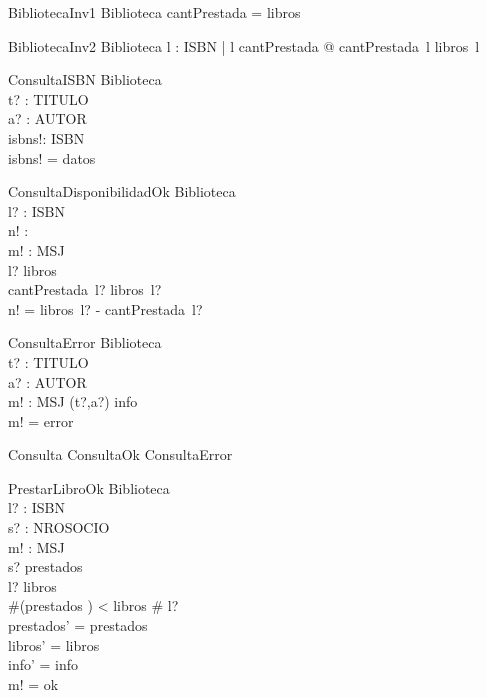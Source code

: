\documentclass{article}
\begin{document}
\begin{schema}{BibliotecaInv1}
Biblioteca
\where
\dom cantPrestada = \dom libros
\end{schema}

\begin{schema}{BibliotecaInv2}
Biblioteca
\where
\forall l : ISBN | l \in \dom cantPrestada @ cantPrestada~l \leq libros~l
\end{schema}

\begin{schema}{ConsultaISBN}
\Xi Biblioteca \\
t? : TITULO \\ 
a? : AUTOR \\
isbns!: \power ISBN \\
\where 
isbns! = datos \rres {} \\
\end{schema}

\begin{schema}{ConsultaDisponibilidadOk}
\Xi Biblioteca \\
l? : ISBN \\ 
n! : \nat \\
m! : MSJ \\
\where 
l? \in \dom libros \\
cantPrestada~l? \leq libros~l? \\
n! = libros~l? - cantPrestada~l? \\
\end{schema}

\begin{schema}{ConsultaError}
\Xi Biblioteca \\
t? : TITULO \\ 
a? : AUTOR \\
m! : MSJ
\where
(t?,a?) \notin \ran info \\
m! = error \\
\end{schema}

\begin{zed}
Consulta  ConsultaOk \lor ConsultaError
\end{zed}

\begin{schema}{PrestarLibroOk}
\Delta Biblioteca \\
l? : ISBN \\ 
s? : NROSOCIO \\
m! : MSJ \\
\where
s? \notin \dom prestados \\
l? \in \dom libros \\
\#(prestados \rres {}) < libros \# l? \\
prestados' = prestados \oplus {} \\
libros' = libros \\
info' = info \\
m! = ok \\
\end{schema}
\end{document}
